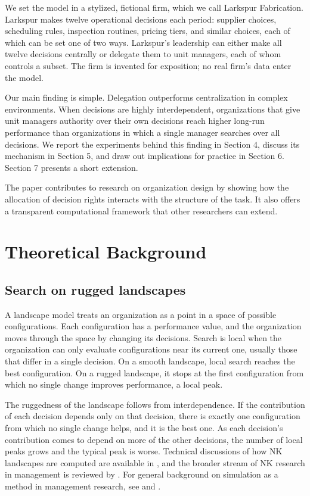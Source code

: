 \documentclass[11pt]{article}
\begin{document}
We set the model in a stylized, fictional firm, which we call Larkspur Fabrication. Larkspur makes twelve operational decisions each period: supplier choices, scheduling rules, inspection routines, pricing tiers, and similar choices, each of which can be set one of two ways. Larkspur's leadership can either make all twelve decisions centrally or delegate them to unit managers, each of whom controls a subset. The firm is invented for exposition; no real firm's data enter the model.

Our main finding is simple. Delegation outperforms centralization in complex environments. When decisions are highly interdependent, organizations that give unit managers authority over their own decisions reach higher long-run performance than organizations in which a single manager searches over all decisions. We report the experiments behind this finding in Section 4, discuss its mechanism in Section 5, and draw out implications for practice in Section 6. Section 7 presents a short extension.

The paper contributes to research on organization design by showing how the allocation of decision rights interacts with the structure of the task. It also offers a transparent computational framework that other researchers can extend.

\section{Theoretical Background}

\subsection{Search on rugged landscapes}

A landscape model treats an organization as a point in a space of possible configurations. Each configuration has a performance value, and the organization moves through the space by changing its decisions. Search is local when the organization can only evaluate configurations near its current one, usually those that differ in a single decision. On a smooth landscape, local search reaches the best configuration. On a rugged landscape, it stops at the first configuration from which no single change improves performance, a local peak.

The ruggedness of the landscape follows from interdependence. If the contribution of each decision depends only on that decision, there is exactly one configuration from which no single change helps, and it is the best one. As each decision's contribution comes to depend on more of the other decisions, the number of local peaks grows and the typical peak is worse. Technical discussions of how NK landscapes are computed are available in \citet{csaszar2018}, and the broader stream of NK research in management is reviewed by \citet{baumann2019}. For general background on simulation as a method in management research, see \citet{davis2007} and \citet{grimm2020}.
\end{document}
